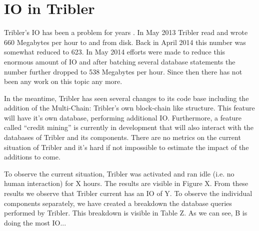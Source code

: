 \chapter{IO in Tribler}

Tribler's IO has been a problem for years \cite{pouwelse2014reduce}.
In May 2013 Tribler read and wrote 660 Megabytes per hour to and from disk.
Back in April 2014 this number was somewhat reduced to 623.
In May 2014 efforts were made to reduce this enormous amount of IO and after batching several database statements the number further dropped to 538 Megabytes per hour.
Since then there has not been any work on this topic any more.

In the meantime, Tribler has seen several changes to its code base including the addition of the Multi-Chain: Tribler's own block-chain like structure.
This feature will have it's own database, performing additional IO.
Furthermore, a feature called ``credit mining'' is currently in development that will also interact with the databases of Tribler and its components.
There are no metrics on the current situation of Tribler and it's hard if not impossible to estimate the impact of the additions to come.

To observe the current situation, Tribler was activated and ran idle (i.e. no human interaction) for X hours.
The results are visible in Figure X.
From these results we observe that Tribler current has an IO of Y.
To observe the individual components separately, we have created a breakdown the database queries performed by Tribler.
This breakdown is visible in Table Z.
As we can see, B is doing the most IO... 

